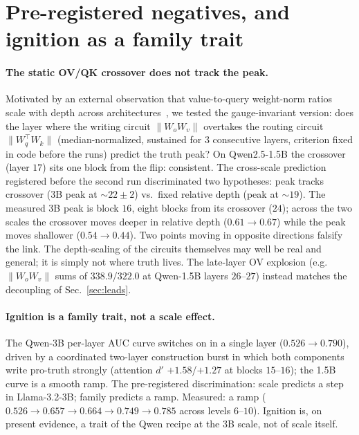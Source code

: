 \documentclass[11pt]{article}
\begin{document}
\section{Pre-registered negatives, and ignition as a family trait}
\label{sec:negatives}

\paragraph{The static OV/QK crossover does not track the peak.} Motivated by
an external observation that value-to-query weight-norm ratios scale with
depth across architectures~\cite{headgenome}, we tested the gauge-invariant
version: does the layer where the writing circuit $\lVert W_o W_v \rVert$
overtakes the routing circuit $\lVert W_q^{\top} W_k \rVert$
(median-normalized, sustained for $3$ consecutive layers, criterion fixed in
code before the runs) predict the truth peak? On Qwen2.5-1.5B the crossover
(layer $17$) sits one block from the flip: consistent. The cross-scale
prediction registered before the second run discriminated two hypotheses:
peak tracks crossover (3B peak at $\sim 22 \pm 2$) vs.\ fixed relative depth
(peak at $\sim 19$). The measured 3B peak is block $16$, eight blocks from
its crossover ($24$); across the two scales the crossover moves deeper in
relative depth ($0.61 \to 0.67$) while the peak moves shallower
($0.54 \to 0.44$). Two points moving in opposite directions falsify the
link. The depth-scaling of the circuits themselves may well be real and
general; it is simply not where truth lives. The late-layer OV explosion
(e.g.\ $\lVert W_o W_v \rVert$ sums of $338.9$/$322.0$ at Qwen-1.5B layers
$26$--$27$) instead matches the decoupling of Sec.~\ref{sec:leads}.

\paragraph{Ignition is a family trait, not a scale effect.} The Qwen-3B
per-layer AUC curve switches on in a single layer ($0.526 \to 0.790$),
driven by a coordinated two-layer construction burst in which both
components write pro-truth strongly (attention $d'$ $+1.58$/$+1.27$ at
blocks $15$--$16$); the 1.5B curve is a smooth ramp. The pre-registered
discrimination: scale predicts a step in Llama-3.2-3B; family predicts a
ramp. Measured: a ramp ($0.526 \to 0.657 \to 0.664 \to 0.749 \to 0.785$
across levels $6$--$10$). Ignition is, on present evidence, a trait of the
Qwen recipe at the 3B scale, not of scale itself.
\end{document}
